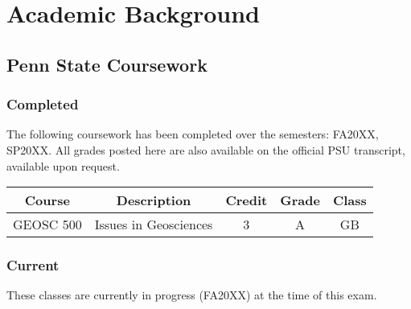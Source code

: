 %
%
% 
%

\chapter{Academic Background}
\newpage
\section{Penn State Coursework}
\singlespacing

\subsection*{Completed}
The following coursework has been completed over the semesters: FA20XX, SP20XX.  All grades posted here are also available on the official PSU transcript, available upon request.

\begin{table}[h]
	\begin{center}
	\begin{tabular}{|c | c | c | c | c |}
		\hline
                  \rowcolor[gray]{.85}
		Course&Description&Credit&Grade&Class\\
		\hline
		 GEOSC 500 & Issues in Geosciences & 3 & A & GB\\
                \hline
	\end{tabular}
	\end{center}
\end{table}

\subsection*{Current}
These classes are currently in progress (FA20XX) at the time of this exam.

